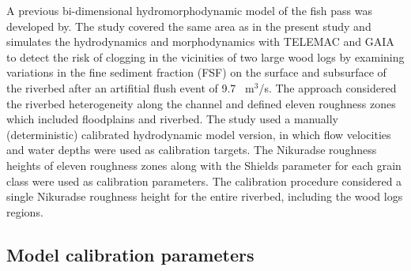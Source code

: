 \documentclass[draft,linenumbers,onecolumn]{agujournal2019} %
\begin{document}
A previous bi-dimensional hydromorphodynamic model of the fish pass was developed by. The study covered the same area as in the present study and simulates the hydrodynamics and morphodynamics with TELEMAC and GAIA to detect the risk of clogging in the vicinities of two large wood logs by examining variations in the fine sediment fraction (FSF) on the surface and subsurface of the riverbed after an artifitial flush event of 9.7 ~m$^3$/s.
The approach considered the riverbed heterogeneity along the channel and defined eleven roughness zones which included floodplains and riverbed. The study used a manually (deterministic) calibrated hydrodynamic model version, in which flow velocities and water depths were used as calibration targets. The Nikuradse roughness heights of eleven roughness zones along with the Shields parameter for each grain class were used as calibration parameters. The calibration procedure considered a single Nikuradse roughness height for the entire riverbed, including the wood logs regions. 



\subsection{Model calibration parameters}
\label{sec:Sec2.5}
\end{document}
